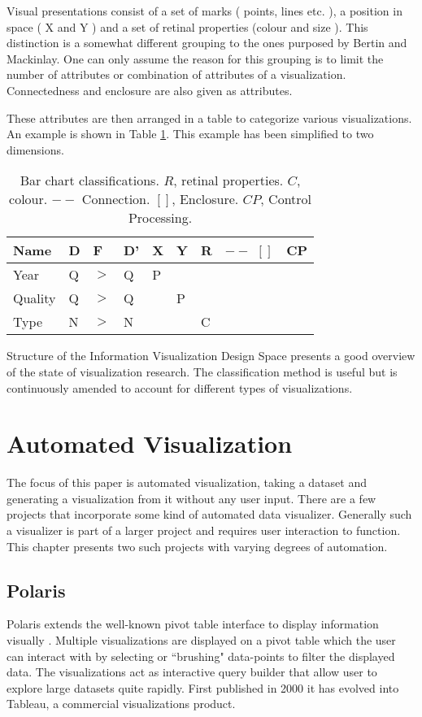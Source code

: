 \documentclass[a4paper, 11pt, titlepage, onehalfspacing]{report}
\begin{document}
Visual presentations consist of a set of marks ( points, lines etc. ), a position in space ( X and Y ) and a set of retinal properties (colour and size ). This distinction is a somewhat different grouping to the ones purposed by Bertin and Mackinlay. One can only assume the reason for this grouping is to limit the number of attributes or combination of attributes of a visualization. Connectedness and enclosure are also given as attributes. 

These attributes are then arranged in a table to categorize various visualizations. An example is shown in Table \ref{struct_table}. This example has been simplified to two dimensions.

\begin{table}[!ht]
\centering
    \begin{tabular}{|llll|llll|l|}
    \hline
    Name    & D & F & D' & X & Y & R & $--$ $[ ]$ & CP \\ \hline
    Year    & Q & $>$ & Q  & P & ~ & ~ & ~    & ~  \\
    Quality & Q & $>$ & Q  & ~ & P & ~ & ~    & ~  \\
    Type    & N & $>$ & N  & ~ & ~ & C & ~    & ~  \\ \hline
    \end{tabular}
\caption{Bar chart classifications. $R$, retinal properties. $C$, colour. $--$ Connection. $[ ]$, Enclosure. $CP$, Control Processing.}
    \label{struct_table}
\end{table}

Structure of the Information Visualization Design Space presents a good overview of the state of visualization research. The classification method is useful but is continuously amended to account for different types of visualizations.



	\section{Automated Visualization}

The focus of this paper is automated visualization, taking a dataset and generating a visualization from it without any user input. There are a few projects that incorporate some kind of automated data visualizer. Generally such a visualizer is part of a larger project and requires user interaction to function. This chapter presents two such projects with varying degrees of automation.

		\subsection{Polaris}
Polaris extends the well-known pivot table interface to display information visually \cite{stolte2002polaris}. Multiple visualizations are displayed on a pivot table which the user can interact with by selecting or ``brushing" data-points to filter the displayed data. The visualizations act as interactive query builder that allow user to explore large datasets quite rapidly. First published in 2000 it has evolved into Tableau, a commercial visualizations product.
\end{document}
